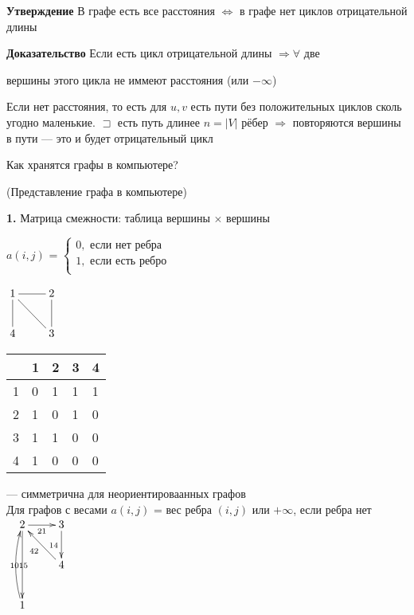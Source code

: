 \documentclass[a4paper, 12pt] {article}
\begin{document}
\textbf{Утверждение} В графе есть все расстояния $ \Leftrightarrow $ в графе нет циклов отрицательной длины

\textbf{Доказательство} Если есть цикл отрицательной длины $ \Rightarrow \forall $ две 

вершины этого цикла не иммеют расстояния (или $ -\infty $)

Если нет расстояния, то есть для $ u, v $ есть пути без положительных циклов сколь угодно маленькие. $ \sqsupset  $ есть путь длинее $ n=|V| $ рёбер $ \Rightarrow $ повторяются вершины в пути --- это и будет отрицательный цикл

Как хранятся графы в компьютере?

(Представление графа в компьютере)

\textbf{1.} Матрица смежности: таблица вершины $ \times $ вершины

$ a(i, j) $ =
$ \left\{
\begin{array}{ccc}
    0, \text{ если нет ребра} \\
	1, \text{ если есть ребро} \\
\end{array}
\right. $

$ \begin{matrix}
	\xymatrix{
		1 \ar@{-}[d] \ar@{-}[r] \ar@{-}[rd]& 2 \ar@{-}[d]  \\
		4 & 3 \\
	}
\end{matrix} $ 

\begin{tabular}{ | l | l | l |  l | l | }
\hline
	 & 1 & 2 & 3  & 4 \\ \hline
	1 & 0 & 1 & 1 & 1 \\ \hline
	2 & 1 & 0 & 1 & 0 \\ \hline
	3 & 1 & 1 & 0 & 0 \\ \hline
	4 & 1 & 0 & 0 & 0 \\
\hline
\end{tabular} --- симметрична для неориентироваанных графов\\

Для графов с весами $ a(i, j) $ = вес ребра $ (i, j) $ или $ + \infty $, если ребра нет\\

$ \begin{matrix}
	\xymatrix{
		2 \ar@{->}[dd]_{10} \ar@{->}[r]_{21} \ar@{<-}[rd]_{42} & 3 \ar@{->}[d]_{14}  \\
		 & 4 \\
		 1 \ar@/^/[uu]_{15} \\
	}
\end{matrix} $ 
\end{document}
